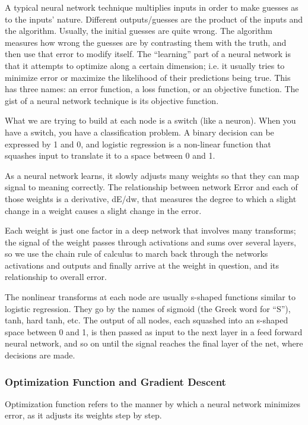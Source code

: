 \documentclass[10pt]{llncs}
\begin{document}
A typical neural network technique multiplies inputs in order to make guesses as to the inputs’ nature. Different outputs/guesses are the product of the inputs and the algorithm. Usually, the initial guesses are quite wrong. The algorithm measures how wrong the guesses are by contrasting them with the truth, and then use that error to modify itself. The “learning” part of a neural network is that it attempts to optimize along a certain dimension; i.e. it usually tries to minimize error or maximize the likelihood of their predictions being true. This has three names: an error function, a loss function, or an objective function. The gist of a neural network technique is its objective function.

What we are trying to build at each node is a switch (like a neuron). When you have a switch, you have a classification problem. A binary decision can be expressed by 1 and 0, and logistic regression is a non-linear function that squashes input to translate it to a space between 0 and 1.

As a neural network learns, it slowly adjusts many weights so that they can map signal to meaning correctly. The relationship between network Error and each of those weights is a derivative, dE/dw, that measures the degree to which a slight change in a weight causes a slight change in the error.

Each weight is just one factor in a deep network that involves many transforms; the signal of the weight passes through activations and sums over several layers, so we use the chain rule of calculus to march back through the networks activations and outputs and finally arrive at the weight in question, and its relationship to overall error.

The nonlinear transforms at each node are usually s-shaped functions similar to logistic regression. They go by the names of sigmoid (the Greek word for “S”), tanh, hard tanh, etc. The output of all nodes, each squashed into an s-shaped space between 0 and 1, is then passed as input to the next layer in a feed forward neural network, and so on until the signal reaches the final layer of the net, where decisions are made.

\subsubsection{Optimization Function and Gradient Descent}
Optimization function refers to the manner by which a neural network minimizes error, as it adjusts its weights step by step.
\end{document}
